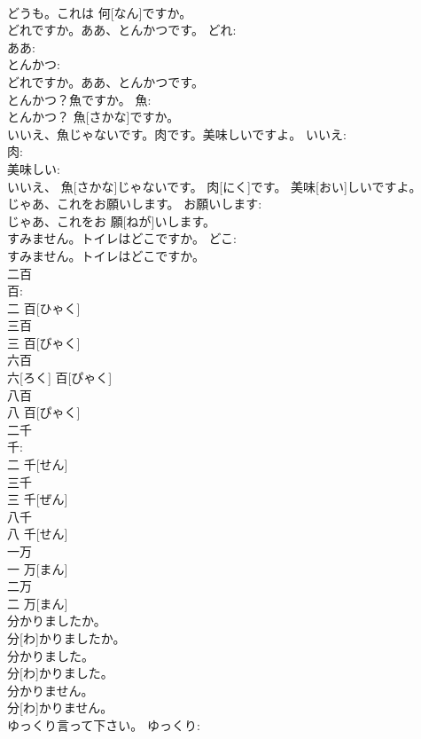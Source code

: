 \documentclass[8pt]{extreport}
\begin{document}
\begin{CJK}{UTF8}{min}
\\	どうも。これは 何[なん]ですか。		
\\	どれですか。ああ、とんかつです。	どれ: 
\\	ああ: 
\\	とんかつ: 
\\	どれですか。ああ、とんかつです。		
\\	とんかつ？魚ですか。	魚: 
\\	とんかつ？ 魚[さかな]ですか。		
\\	いいえ、魚じゃないです。肉です。美味しいですよ。	いいえ: 
\\	肉: 
\\	美味しい: 
\\	いいえ、 魚[さかな]じゃないです。 肉[にく]です。 美味[おい]しいですよ。		
\\	じゃあ、これをお願いします。	お願いします: 
\\	じゃあ、これをお 願[ねが]いします。		
\\	すみません。トイレはどこですか。	どこ: 
\\	すみません。トイレはどこですか。		
\\	二百	
\\	百: 
\\	二 百[ひゃく]		
\\	三百	
\\	三 百[びゃく]		
\\	六百	
\\	六[ろく] 百[ぴゃく]		
\\	八百	
\\	八 百[ぴゃく]		
\\	二千	
\\	千: 
\\	二 千[せん]		
\\	三千	
\\	三 千[ぜん]		
\\	八千	
\\	八 千[せん]		
\\	一万	
\\	一 万[まん]		
\\	二万	
\\	二 万[まん]		
\\	分かりましたか。	
\\	分[わ]かりましたか。		
\\	分かりました。	
\\	分[わ]かりました。		
\\	分かりません。	
\\	分[わ]かりません。		
\\	ゆっくり言って下さい。	ゆっくり: 

\end{CJK}
\end{document}
